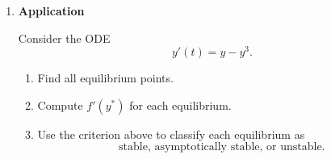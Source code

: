 \documentclass[11pt]{article}
\begin{document}
\begin{enumerate}
\begin{enumerate}
\begin{enumerate}
\item State a condition on \(f'(y^\ast)\) that guarantees local asymptotic stability of \(y^\ast\).
\item State a condition on \(f'(y^\ast)\) that implies instability.
\end{enumerate}

\item \textbf{Application}

Consider the ODE
\[
y'(t)= y - y^3.
\]

\begin{enumerate}
\item Find all equilibrium points.
\item Compute \(f'(y^\ast)\) for each equilibrium.
\item Use the criterion above to classify each equilibrium as
\[
\text{stable, asymptotically stable, or unstable}.
\]

\end{enumerate}
\end{enumerate}
\end{enumerate}
\end{document}
